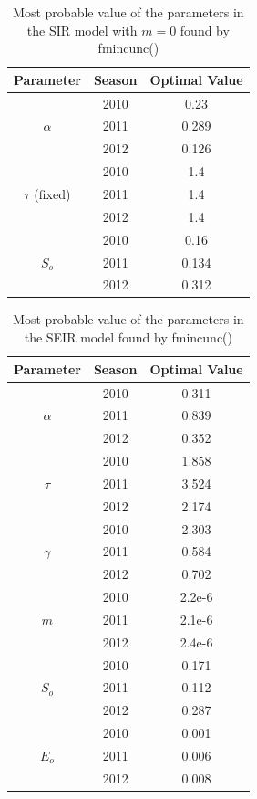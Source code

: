 \documentclass[11pt, a4paper]{article}
\begin{document}
\begin{table}[H]
\FloatBarrier
\centering
\begin{tabular}{| c | c | c |}
    \hline
    Parameter & Season & Optimal Value \\ \hline
    \multirow{3}{*}{$\alpha$} & 2010 & 0.23\\
    & 2011 & 0.289\\
    & 2012 & 0.126 \\ \hline
    \multirow{3}{*}{$\tau$ (fixed) } & 2010 & 1.4 \\ 
    & 2011 & 1.4\\
    & 2012 & 1.4\\ \hline
    \multirow{3}{*}{$S_o$} & 2010 & 0.16 \\ 
    & 2011 & 0.134 \\ 
    & 2012 & 0.312 \\ \hline
    \end{tabular}
    \caption{Most probable value of the parameters in the SIR model with $m=0$ found by fmincunc()}
    \label{tab:sir0}
\end{table}


\begin{table}[H]
\FloatBarrier
\centering
\begin{tabular}{| c | c | c |}
    \hline
    Parameter & Season & Optimal Value \\ \hline
    \multirow{3}{*}{$\alpha$} & 2010 & 0.311\\
    & 2011 & 0.839\\
    & 2012 & 0.352 \\ \hline
    \multirow{3}{*}{$\tau$} & 2010 & 1.858 \\ 
    & 2011 & 3.524\\
    & 2012 & 2.174\\ \hline
    \multirow{3}{*}{$\gamma$} & 2010 & 2.303 \\ 
    & 2011 & 0.584\\
    & 2012 & 0.702\\ \hline
    \multirow{3}{*}{$m$} & 2010 & 2.2e-6\\ 
    & 2011 & 2.1e-6 \\
    & 2012 & 2.4e-6 \\ \hline
    \multirow{3}{*}{$S_o$} & 2010 & 0.171 \\ 
    & 2011 & 0.112 \\ 
    & 2012 & 0.287 \\ \hline
    \multirow{3}{*}{$E_o$} & 2010 & 0.001 \\ 
    & 2011 & 0.006 \\ 
    & 2012 & 0.008 \\ \hline
    \end{tabular}
    \caption{Most probable value of the parameters in the SEIR model found by fmincunc()}
    \label{tab:seir}
\end{table}
\end{document}
